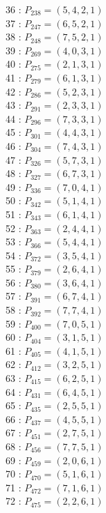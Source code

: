 \documentclass{article}
\begin{document}
{\begin{multicols}{3}
36 : $P_{238}=( 5, 4, 2, 1 )$\\
37 : $P_{247}=( 6, 5, 2, 1 )$\\
38 : $P_{248}=( 7, 5, 2, 1 )$\\
39 : $P_{269}=( 4, 0, 3, 1 )$\\
40 : $P_{275}=( 2, 1, 3, 1 )$\\
41 : $P_{279}=( 6, 1, 3, 1 )$\\
42 : $P_{286}=( 5, 2, 3, 1 )$\\
43 : $P_{291}=( 2, 3, 3, 1 )$\\
44 : $P_{296}=( 7, 3, 3, 1 )$\\
45 : $P_{301}=( 4, 4, 3, 1 )$\\
46 : $P_{304}=( 7, 4, 3, 1 )$\\
47 : $P_{326}=( 5, 7, 3, 1 )$\\
48 : $P_{327}=( 6, 7, 3, 1 )$\\
49 : $P_{336}=( 7, 0, 4, 1 )$\\
50 : $P_{342}=( 5, 1, 4, 1 )$\\
51 : $P_{343}=( 6, 1, 4, 1 )$\\
52 : $P_{363}=( 2, 4, 4, 1 )$\\
53 : $P_{366}=( 5, 4, 4, 1 )$\\
54 : $P_{372}=( 3, 5, 4, 1 )$\\
55 : $P_{379}=( 2, 6, 4, 1 )$\\
56 : $P_{380}=( 3, 6, 4, 1 )$\\
57 : $P_{391}=( 6, 7, 4, 1 )$\\
58 : $P_{392}=( 7, 7, 4, 1 )$\\
59 : $P_{400}=( 7, 0, 5, 1 )$\\
60 : $P_{404}=( 3, 1, 5, 1 )$\\
61 : $P_{405}=( 4, 1, 5, 1 )$\\
62 : $P_{412}=( 3, 2, 5, 1 )$\\
63 : $P_{415}=( 6, 2, 5, 1 )$\\
64 : $P_{431}=( 6, 4, 5, 1 )$\\
65 : $P_{435}=( 2, 5, 5, 1 )$\\
66 : $P_{437}=( 4, 5, 5, 1 )$\\
67 : $P_{451}=( 2, 7, 5, 1 )$\\
68 : $P_{456}=( 7, 7, 5, 1 )$\\
69 : $P_{459}=( 2, 0, 6, 1 )$\\
70 : $P_{470}=( 5, 1, 6, 1 )$\\
71 : $P_{472}=( 7, 1, 6, 1 )$\\
72 : $P_{475}=( 2, 2, 6, 1 )$\\

\end{multicols}}
\end{document}
